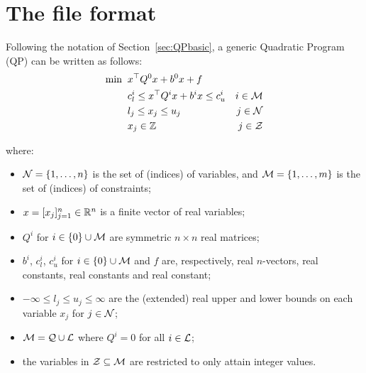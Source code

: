 \section{The file format}\label{sec:format}

\newcommand{\vect}[1]{\left(\begin{array}{c}#1\end{array}\right)}
\newcommand{\mat}[2]{\left(\begin{array}{#1}#2\end{array}\right)}
\newcommand{\arr}[2]{\begin{array}{#1}#2\end{array}}
\newcommand{\mininx}[1]{ {\renewcommand{\arraystretch}{0.8}
                     \begin{array}[t]{c}
                     \mbox{minimize} \vspace*{-1mm} \\
                     \mbox{ $\scriptstyle x \in \smallRe^n #1 $ }
                     \end{array} \;} }
\newcommand{\s}[1]{^{\mbox{\protect\tiny #1}}}
\newcommand{\sfrac}[2]{{\scriptstyle \frac{#1}{#2}}}
\newcommand{\half}{\sfrac{1}{2}}
\newcommand{\smallRe}
     {\mbox{\raisebox{-0.8pt}{\footnotesize I\hskip -1.5pt R\hskip -0.5pt}}}
\newcommand{\tim}[1]{\;\; \mbox{#1} \;\;}
\newcommand{\st}{\mbox{subject to}\;\;}
\newcommand{\lbox}[1]{\parbox[t]{105mm}{#1}\vspace*{1mm}}

Following the notation of Section~\ref{sec:QPbasic}, a generic Quadratic Program (QP) can be written as follows:
%
\begin{align*}	
 \min \;\;
 & x^\top Q^0 x + b^0 x + f \\
 & c^i_l \leq x^\top Q^i x + b^i x \leq c^i_u & i \in \mathcal{M} \\ 
 & l_j \leq x_j \leq u_j & j \in \mathcal{N}  \\
 & x_j \in \mathbb{Z} & j \in \mathcal{Z}
\end{align*}

where:

\begin{itemize}
 \item $\mathcal{N} = \{ 1, \ldots, n \}$ is the set of (indices) of variables, and $\mathcal{M} = \{ 1, \ldots, m \}$ is the set of (indices) of constraints;
 \item $x = [x_j]_{j = 1}^n \in \mathbb{R}^n$ is a finite vector of real variables;
 \item $Q^i$ for $i \in \{ 0 \} \cup \mathcal{M}$ are symmetric $n \times n$ real matrices;
 \item $b^i$, $c^i_l$, $c^i_u$ for $i \in \{ 0 \} \cup \mathcal{M}$ and $f$ are, respectively, real $n$-vectors, real constants, real constants and real constant;
 \item $-\infty \leq l_j \leq u_j \leq \infty$ are the (extended) real upper and lower bounds on each variable $x_j$ for $j \in \mathcal{N}$;
 \item $\mathcal{M} = \mathcal{Q} \cup \mathcal{L}$ where $Q^i = 0$ for all $i \in \mathcal{L}$;
 \item the variables in $\mathcal{Z} \subseteq \mathcal{M}$ are restricted to only attain integer values.
\end{itemize}

